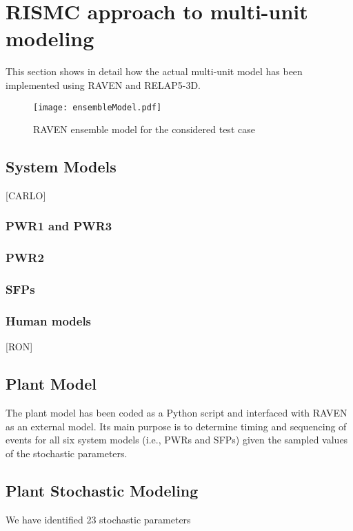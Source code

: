 \section{RISMC approach to multi-unit modeling}
\label{sec:RISMC_MU_modeling}

This section shows in detail how the actual multi-unit model has been implemented
using RAVEN and RELAP5-3D. 

\begin{figure}
    \centering
    \texttt{[image: ensembleModel.pdf]}
    \caption{RAVEN ensemble model for the considered test case}
    \label{fig:ensembleModel}
\end{figure}

\subsection{System Models}
[CARLO]
\subsubsection{PWR1 and PWR3}

\subsubsection{PWR2}

\subsubsection{SFPs}

\subsubsection{Human models}
[RON]

\subsection{Plant Model}
The plant model has been coded as a Python script and interfaced with RAVEN as an 
external model. Its main purpose is to determine timing and sequencing of events 
for all six system models (i.e., PWRs and SFPs) given the sampled values of the 
stochastic parameters.

\subsection{Plant Stochastic Modeling}
We have identified 23 stochastic parameters 

